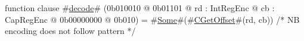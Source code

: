 function clause #\hyperref[zdecode]{decode}# (0b010010 @ 0b01101 @ rd : IntRegEnc @ cb : CapRegEnc @ 0b00000000 @ 0b010) = #\hyperref[zSome]{Some}#(#\hyperref[zCGetOffset]{CGetOffset}#(rd, cb)) /* NB encoding does not follow pattern */
